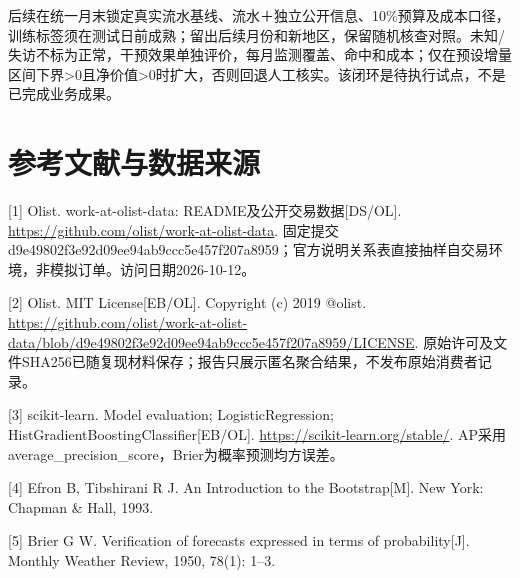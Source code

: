 \documentclass[a4paper,10pt]{article}
\begin{document}
后续在统一月末锁定真实流水基线、流水＋独立公开信息、10\%预算及成本口径，训练标签须在测试日前成熟；留出后续月份和新地区，保留随机核查对照。未知/失访不标为正常，干预效果单独评价，每月监测覆盖、命中和成本；仅在预设增量区间下界>0且净价值>0时扩大，否则回退人工核实。该闭环是待执行试点，不是已完成业务成果。


\newpage
{}
\section*{参考文献与数据来源}
[1] Olist. work-at-olist-data: README及公开交易数据[DS/OL]. \url{https://github.com/olist/work-at-olist-data}. 固定提交d9e49802f3e92d09ee94ab9ccc5e457f207a8959；官方说明关系表直接抽样自交易环境，非模拟订单。访问日期2026-10-12。

[2] Olist. MIT License[EB/OL]. Copyright (c) 2019 @olist. \url{https://github.com/olist/work-at-olist-data/blob/d9e49802f3e92d09ee94ab9ccc5e457f207a8959/LICENSE}. 原始许可及文件SHA256已随复现材料保存；报告只展示匿名聚合结果，不发布原始消费者记录。

[3] scikit-learn. Model evaluation; LogisticRegression; HistGradientBoostingClassifier[EB/OL]. \url{https://scikit-learn.org/stable/}. AP采用average\_precision\_score，Brier为概率预测均方误差。

[4] Efron B, Tibshirani R J. An Introduction to the Bootstrap[M]. New York: Chapman \& Hall, 1993.

[5] Brier G W. Verification of forecasts expressed in terms of probability[J]. Monthly Weather Review, 1950, 78(1): 1–3.
\end{document}
